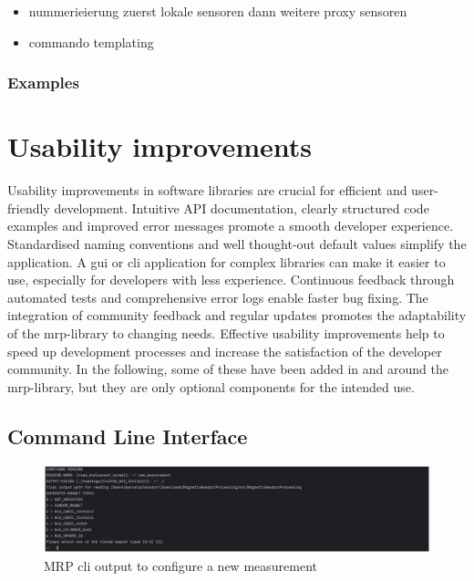 \begin{itemize}
\tightlist
\item
  nummerieierung zuerst lokale sensoren dann weitere proxy sensoren
\item
  commando templating
\end{itemize}

\hypertarget{examples}{%
\subsection{Examples}\label{examples}}

\hypertarget{usability-improvements}{%
\chapter{Usability improvements}\label{usability-improvements}}

Usability improvements in software libraries are crucial for efficient
and user-friendly development. Intuitive API documentation, clearly
structured code examples and improved error messages promote a smooth
developer experience. Standardised naming conventions and well
thought-out default values simplify the application. A \gls{gui} or
\gls{cli} application for complex libraries can make it easier to use,
especially for developers with less experience. Continuous feedback
through automated tests and comprehensive error logs enable faster bug
fixing. The integration of community feedback and regular updates
promotes the adaptability of the \gls{mrp}-library to changing needs.
Effective usability improvements help to speed up development processes
and increase the satisfaction of the developer community. In the
following, some of these have been added in and around the
\gls{mrp}-library, but they are only optional components for the
intended use.

\hypertarget{command-line-interface}{%
\section{Command Line Interface}\label{command-line-interface}}

\begin{figure}
\centering
\includegraphics{./generated_images/border_MRP_(+cli)_output_to_configure_a_new_measurement.png}
\caption{MRP \gls{cli} output to configure a new measurement
\label{MRP_(+cli)_output_to_configure_a_new_measurement.png}}
\end{figure}

